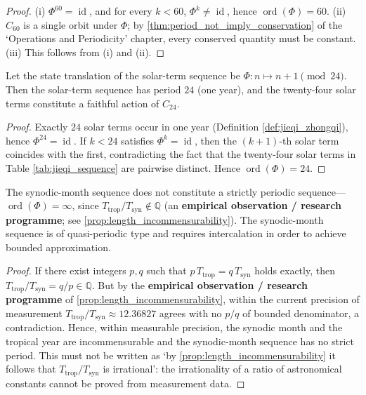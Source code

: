 \begin{proof}
(i) \(\Phi^{60}=\operatorname{id}\), and for every \(k<60\), \(\Phi^k\neq\operatorname{id}\), hence \(\operatorname{ord}(\Phi)=60\).
(ii) \(C_{60}\) is a single orbit under \(\Phi\); by \cref{thm:period_not_imply_conservation} of the `Operations and Periodicity' chapter, every conserved quantity must be constant.
(iii) This follows from (i) and (ii).
\end{proof}

\begin{lemma}\label{lem:jieqi_period}
Let the state translation of the solar-term sequence be \(\Phi:n\mapsto n+1\pmod{24}\). Then the solar-term sequence has period \(24\) (one year), and the twenty-four solar terms constitute a faithful action of \(C_{24}\).
\end{lemma}

\begin{proof}
Exactly \(24\) solar terms occur in one year (Definition \ref{def:jieqi_zhongqi}), hence \(\Phi^{24}=\operatorname{id}\). If \(k<24\) satisfies \(\Phi^k=\operatorname{id}\), then the \((k+1)\)-th solar term coincides with the first, contradicting the fact that the twenty-four solar terms in Table \ref{tab:jieqi_sequence} are pairwise distinct. Hence \(\operatorname{ord}(\Phi)=24\).
\end{proof}

\begin{lemma}\label{lem:synodic_month_period}
The synodic-month sequence does not constitute a strictly periodic sequence---\(\operatorname{ord}(\Phi)=\infty\), since \(T_{\text{trop}}/T_{\text{syn}}\notin\mathbb Q\) (an \textbf{empirical observation / research programme}; see \cref{prop:length_incommensurability}). The synodic-month sequence is of quasi-periodic type and requires intercalation in order to achieve bounded approximation.
\end{lemma}

\begin{proof}
If there exist integers \(p,q\) such that \(p\,T_{\text{trop}}=q\,T_{\text{syn}}\) holds exactly, then \(T_{\text{trop}}/T_{\text{syn}}=q/p\in\mathbb Q\). But by the \textbf{empirical observation / research programme} of \cref{prop:length_incommensurability}, within the current precision of measurement \(T_{\text{trop}}/T_{\text{syn}}\approx 12.36827\) agrees with no \(p/q\) of bounded denominator, a contradiction. Hence, within measurable precision, the synodic month and the tropical year are incommensurable and the synodic-month sequence has no strict period. This must not be written as `by \cref{prop:length_incommensurability} it follows that \(T_{\text{trop}}/T_{\text{syn}}\) is irrational': the irrationality of a ratio of astronomical constants cannot be proved from measurement data.
\end{proof}

